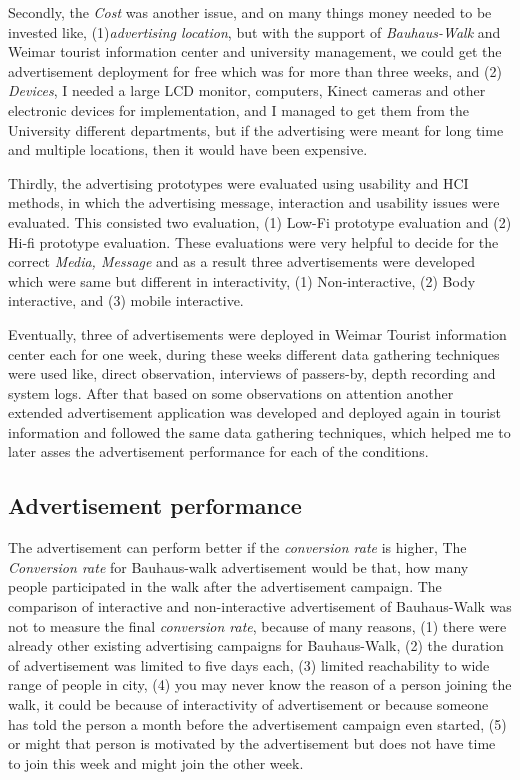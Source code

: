 Secondly, the \emph{Cost} was another issue, and on many things money needed to be invested like, (1)\emph{advertising location}, but with the support of \emph{Bauhaus-Walk} and Weimar tourist information center and university management, we could get the advertisement deployment for free which was for more than three weeks, and (2) \emph{Devices}, I needed a large LCD monitor, computers, Kinect cameras and other electronic devices for implementation, and I managed to get them from the University different departments, but if the advertising were meant for long time and multiple locations, then it would have been expensive. 

Thirdly, the advertising prototypes were evaluated using usability and HCI methods, in which the advertising message, interaction and usability issues were evaluated. This consisted two evaluation, (1) Low-Fi prototype evaluation and (2) Hi-fi prototype evaluation. These evaluations were very helpful to decide for the correct \emph{Media, Message } and as a result three advertisements were developed which were same but different in interactivity, (1) Non-interactive, (2) Body interactive, and (3) mobile interactive.

Eventually, three of advertisements were deployed in Weimar Tourist information center each for one week, during these weeks different data gathering techniques were used like, direct observation, interviews of passers-by, depth recording and system logs. After that based on some observations on attention another extended advertisement application was developed and deployed again in tourist information and followed the same data gathering techniques, which helped me to later asses the advertisement performance for each of the conditions.

\subsection{Advertisement performance}
The advertisement can perform better if the \emph{conversion rate} is higher, The \emph{Conversion rate} for Bauhaus-walk advertisement would be that, how many people participated in the walk after the advertisement campaign. The comparison of interactive and non-interactive advertisement of Bauhaus-Walk was not to measure the final \emph{conversion rate}, because of many reasons, (1) there were already other existing advertising campaigns for Bauhaus-Walk, (2) the duration of advertisement was limited to five days each, (3) limited reachability to wide range of people in city, (4) you may never know the reason of a person joining the walk, it could be because of interactivity of advertisement or because someone has told the person a month before the advertisement campaign even started, (5) or might that person is motivated by the advertisement but does not have time to join this week and might join the other week.

